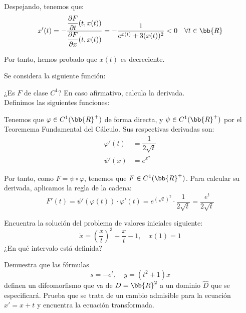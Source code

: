 \documentclass[12pt]{article}
\begin{document}
\begin{ejercicio}
\begin{description}
            Despejando, tenemos que:
            \begin{equation*}
                x'(t) = -\dfrac{\dfrac{\partial F}{\partial t}(t, x(t))}{\dfrac{\partial F}{\partial x}(t, x(t))} = -\dfrac{1}{e^{x(t)} + 3(x(t))^2} < 0 \quad \forall t\in\bb{R}
            \end{equation*}

            Por tanto, hemos probado que $x(t)$ es decreciente.
        \end{description}
    \end{ejercicio}


\begin{ejercicio}
    Se considera la siguiente función:
    \Func{F}{]0, +\infty[}{\bb{R}}{t}{\displaystyle \int_0^{\sqrt{t}} e^{s^2} ~ds}

    ¿Es $F$ de clase $C^1$? En caso afirmativo, calcula la derivada.\\

    Definimos las siguientes funciones:

    Tenemos que $\varphi\in C^1(\bb{R}^+)$ de forma directa, y $\psi\in C^1(\bb{R}^+)$ por el Teoremema Fundamental del Cálculo. Sus respectivas derivadas son:
    \begin{align*}
        \varphi'(t) &= \dfrac{1}{2\sqrt{t}}\\
        \psi'(x) &= e^{x^2}
    \end{align*}
    
    
    Por tanto, como $F = \psi\circ\varphi$, tenemos que $F\in C^1(\bb{R}^+)$. Para calcular su derivada, aplicamos la regla de la cadena:
    \begin{equation*}
        F'(t) = \psi'(\varphi(t))\cdot\varphi'(t) = e^{(\sqrt{t})^2}\cdot\dfrac{1}{2\sqrt{t}} = \dfrac{e^t}{2\sqrt{t}}
    \end{equation*}
\end{ejercicio}


\begin{ejercicio}
    Encuentra la solución del problema de valores iniciales siguiente:
    \begin{equation*}
        \dot{x} = \left(\dfrac{x}{t}\right)^3 + \dfrac{x}{t} - 1, \quad x(1) = 1
    \end{equation*}
    ¿En qué intervalo está definida?
\end{ejercicio}


\begin{ejercicio}
    Demuestra que las fórmulas
    \begin{equation*}
        s = -e^t, \quad y = (t^2 + 1)x
    \end{equation*}
    definen un difeomorfismo que va de $D = \bb{R}^2$ a un dominio $\hat{D}$ que se especificará.
    Prueba que se trata de un cambio admisible para la ecuación $x' = x + t$ y encuentra la ecuación transformada.
\end{ejercicio}
\end{document}
